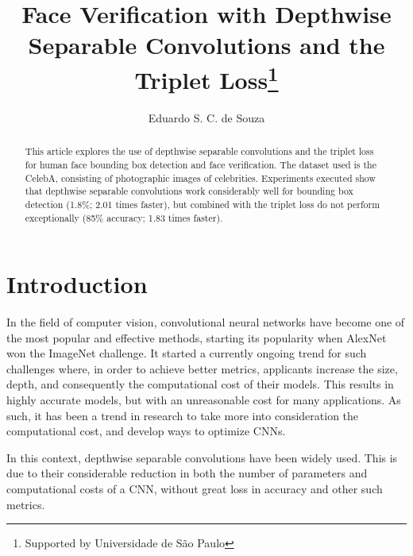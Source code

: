 \documentclass[runningheads]{llncs}
\begin{document}
\title{Face Verification with Depthwise Separable Convolutions and the Triplet Loss\thanks{Supported by Universidade de São Paulo}}

\author{Eduardo S. C. de Souza}



\maketitle

\begin{abstract}
This article explores the use of depthwise separable convolutions and the triplet loss for human face bounding box detection and face verification. The dataset used is the CelebA, consisting of photographic images of celebrities. Experiments executed show that depthwise separable convolutions work considerably well for bounding box detection (1.8\%; 2.01 times faster), but combined with the triplet loss do not perform exceptionally (85\% accuracy; 1.83 times faster).

\end{abstract}



\section{Introduction}

In the field of computer vision, convolutional neural networks have become one of the most popular and effective methods, starting its popularity when AlexNet\cite{NIPS2012_4824} won the ImageNet challenge\cite{ILSVRC15}. It started a currently ongoing trend for such challenges where, in order to achieve better metrics, applicants increase the size, depth, and consequently the computational cost of their models. This results in highly accurate models, but with an unreasonable cost for many applications. As such, it has been a trend in research to take more into consideration the computational cost, and develop ways to optimize CNNs.

In this context, depthwise separable convolutions\cite{sifre2014rigid,howard2017mobilenets} have been widely used. This is due to their considerable reduction in both the number of parameters and computational costs of a CNN, without great loss in accuracy and other such metrics.
\end{document}
